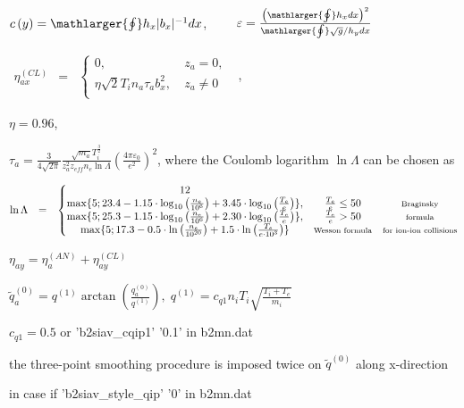 \documentclass[a4paper,10pt]{report}
\begin{document}
$c \left( y \right) = \mathlarger{\oint} h_x |b_x|^{-1} dx$, \ \ \ \  $\varepsilon = \frac
{\left( \mathlarger{\oint} h_x dx \right)^2}
{\mathlarger{\oint} \sqrt g / h_y dx}$

$
\begin{matrix}
\eta^{(CL)}_{ax} & =
& \left\{
\begin{matrix}
0, & \ z_a = 0 ,  \\
\eta \sqrt{2} T_i n_a \tau_a b_x^2, & \ z_a \neq 0  \\
\end{matrix} \right.
\end{matrix}$
,

$\eta = 0.96$,

$\tau _a = \frac 3{4 \sqrt{2\pi}}
\frac {\sqrt{m_a} T_i^{\frac 3 2}} {z_a^2 z_{eff} n_e \ln \Lambda}
\left( \frac{4 \pi \varepsilon_0}{e^2} \right)^2$, where the Coulomb logarithm $\ln \Lambda $
can be chosen as

$
\begin{matrix}
\ln \Lambda & =
& \left\{
\begin{matrix}
12 \\
\max \{ 5; 23.4 - 1.15 \cdot \log_{10} \left( \frac{n_e}{10^6} \right) + 3.45 \cdot \log_{10} \left( \frac{T_e}e \right)  \}, & \frac{T_e}{e} \leq 50 & \mbox{\scriptsize{Braginsky}} \\
\max \{ 5; 25.3 - 1.15 \cdot \log_{10} \left( \frac{n_e}{10^6} \right) + 2.30 \cdot \log_{10} \left( \frac{T_e}e \right)  \}, & \frac{T_e}{e} > 50  & \mbox{\scriptsize{formula}}\\
\max \{ 5; 17.3 - 0.5 \cdot \ln \left( \frac{n_e}{10^{20}} \right) + 1.5 \cdot \ln \left( \frac{T_e}{e \cdot 10^3} \right)  \} & \mbox{\scriptsize{Wesson formula}} & \mbox{\scriptsize{for ion-ion collisions}} \\
\end{matrix} \right.
\end{matrix}
$

$\eta_{ay} = \eta^{(AN)}_a + \eta^{(CL)}_{ay}$

$\widetilde{q}_a^{(0)} = q^{(1)} \arctan \left( \frac{q_a^{(0)}}{q^{(1)}} \right), \; q^{(1)} = c_{q1} n_i T_i \sqrt{\frac{T_i + T_e}{m_i}}$

$c_{q1} = 0.5$ or 'b2siav\_cqip1'  '0.1' in b2mn.dat

the three-point smoothing procedure is imposed twice on $\widetilde{q}^{(0)}$ along x-direction

in case if 'b2siav\_style\_qip'  '0' in b2mn.dat
\end{document}
